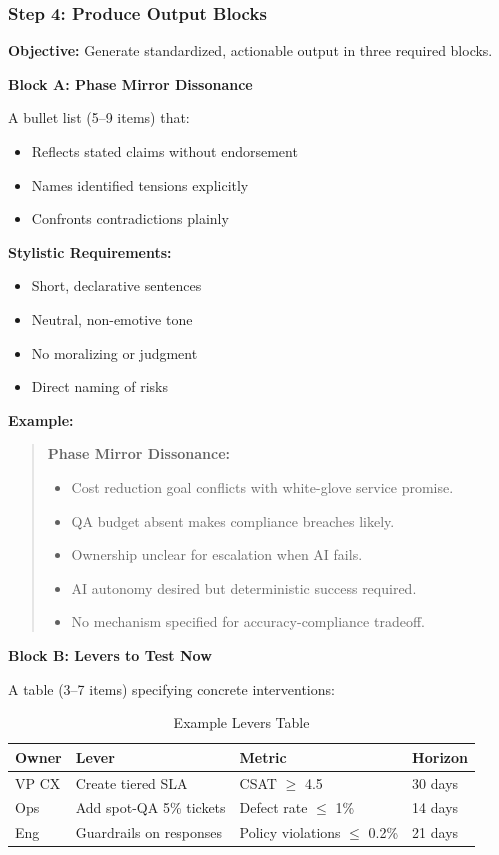 \documentclass[11pt,a4paper]{article}
\begin{document}
\subsubsection{Step 4: Produce Output Blocks}

\textbf{Objective:} Generate standardized, actionable output in three required blocks.

\textbf{Block A: Phase Mirror Dissonance}

A bullet list (5--9 items) that:
\begin{itemize}
\item Reflects stated claims without endorsement
\item Names identified tensions explicitly
\item Confronts contradictions plainly
\end{itemize}

\textbf{Stylistic Requirements:}
\begin{itemize}
\item Short, declarative sentences
\item Neutral, non-emotive tone
\item No moralizing or judgment
\item Direct naming of risks
\end{itemize}

\textbf{Example:}
\begin{quote}
\textbf{Phase Mirror Dissonance:}
\begin{itemize}
\item Cost reduction goal conflicts with white-glove service promise.
\item QA budget absent makes compliance breaches likely.
\item Ownership unclear for escalation when AI fails.
\item AI autonomy desired but deterministic success required.
\item No mechanism specified for accuracy-compliance tradeoff.
\end{itemize}
\end{quote}

\textbf{Block B: Levers to Test Now}

A table (3--7 items) specifying concrete interventions:

\begin{table}[h]
\centering
\begin{tabular}{|l|l|l|l|}
\hline
\textbf{Owner} & \textbf{Lever} & \textbf{Metric} & \textbf{Horizon} \\ \hline
VP CX & Create tiered SLA & CSAT $\geq$ 4.5 & 30 days \\ \hline
Ops & Add spot-QA 5\% tickets & Defect rate $\leq$ 1\% & 14 days \\ \hline
Eng & Guardrails on responses & Policy violations $\leq$ 0.2\% & 21 days \\ \hline
\end{tabular}
\caption{Example Levers Table}
\end{table}
\end{document}
